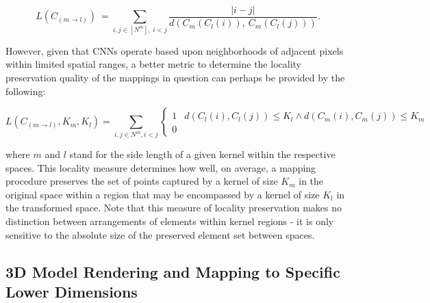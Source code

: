 \documentclass{article}
\begin{document}
\begin{equation}
    L(C_{(m \rightarrow l)})\ = \sum_{i,j \in [N^m],\ i<j}^{} \frac{|i-j|}{d(C_m(C_l(i)),\ C_m(C_l(j)))}.
\end{equation}

However, given that CNNs operate based upon neighborhoods of adjacent pixels within limited spatial ranges, a better metric to determine the locality preservation quality of the mappings in question can perhaps be provided by the following:

\begin{equation}
    L(C_{(m \rightarrow l)}, K_m, K_l)=\sum_{i,j\in N^m, i < j}^{}
    \begin{cases}
        1 & d(C_l(i),C_l(j)) \leq K_l \land d(C_m(i),C_m(j)) \leq K_m \\
        0
    \end{cases}
\end{equation}

where $m$ and $l$ stand for the side length of a given kernel within the respective spaces. This locality measure determines how well, on average, a mapping procedure preserves the set of points captured by a kernel of size $K_m$ in the original space within a region that may be encompassed by a kernel of size $K_l$ in the transformed space. Note that this measure of locality preservation makes no distinction between arrangements of elements within kernel regions - it is only sensitive to the absolute size of the preserved element set between spaces. 

\subsection{3D Model Rendering and Mapping to Specific Lower Dimensions}
\end{document}
